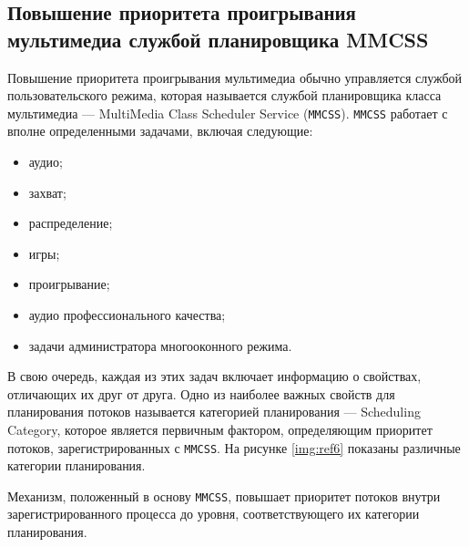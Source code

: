 \documentclass[a4paper,oneside,14pt]{extreport}
\begin{document}
\begin{figure}[ht!]
\end{figure}

\newpage
\subsection*{Повышение приоритета проигрывания мультимедиа службой планировщика MMCSS}

Повышение приоритета проигрывания мультимедиа обычно управляется
службой пользовательского режима, которая называется службой планировщика 
класса мультимедиа — MultiMedia Class Scheduler Service (\texttt{MMCSS}).
\texttt{MMCSS} работает с вполне определенными задачами, включая следующие:

\begin{itemize}
	\item аудио;
	\item захват;
	\item распределение;
	\item игры;
	\item проигрывание;
	\item аудио профессионального качества;
	\item задачи администратора многооконного режима.
\end{itemize}

В свою очередь, каждая из этих задач включает информацию о свойствах, отличающих
их друг от друга. Одно из наиболее важных свойств для планирования
потоков называется категорией планирования — Scheduling Category, которое
является первичным фактором, определяющим приоритет потоков, зарегистрированных
с \texttt{MMCSS}. На рисунке \ref{img:ref6} показаны различные категории планирования.

Механизм, положенный в основу \texttt{MMCSS}, повышает приоритет потоков
внутри зарегистрированного процесса до уровня, соответствующего их категории
планирования.

\begin{figure}[h]
\end{figure}
\end{document}

